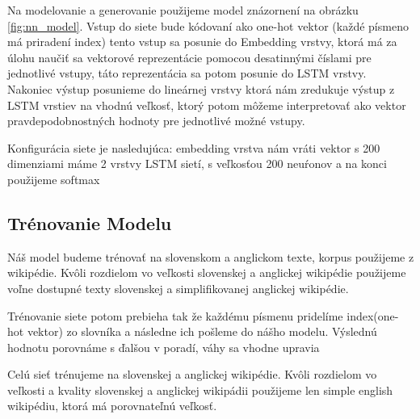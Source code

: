 Na modelovanie a generovanie použijeme model znázornení na obrázku \ref{fig:nn_model}. Vstup do siete bude kódovaní ako one-hot vektor (každé písmeno má priradení index) tento vstup sa posunie do Embedding vrstvy, ktorá má za úlohu naučiť sa vektorové reprezentácie pomocou desatinnými číslami pre jednotlivé vstupy, táto reprezentácia sa potom posunie do LSTM vrstvy. Nakoniec výstup posunieme do lineárnej vrstvy ktorá nám zredukuje výstup z LSTM vrstiev na vhodnú veľkosť, ktorý potom môžeme interpretovať ako vektor pravdepodobnostných hodnoty pre jednotlivé možné vstupy.

Konfigurácia siete je nasledujúca:
embedding vrstva nám vráti vektor s 200 dimenziami
máme 2 vrstvy LSTM sietí, s veľkosťou 200 neuŕonov
a na konci použijeme softmax

\subsection{Trénovanie Modelu}

Náš model budeme trénovať na slovenskom a anglickom texte, korpus použijeme z wikipédie. Kvôli rozdielom vo veľkosti slovenskej a anglickej wikipédie použijeme voľne dostupné texty slovenskej a simplifikovanej anglickej wikipédie.

Trénovanie siete potom prebieha tak že každému písmenu pridelíme index(one-hot vektor) zo slovníka a následne ich pošleme do nášho modelu. Výslednú hodnotu porovnáme s ďalšou v poradí, váhy sa vhodne upravia

Celú sieť trénujeme na slovenskej a anglickej wikipédie. Kvôli rozdielom vo veľkosti a kvality slovenskej a anglickej wikipádii použijeme len simple english wikipédiu, ktorá má porovnateľnú veľkosť.

